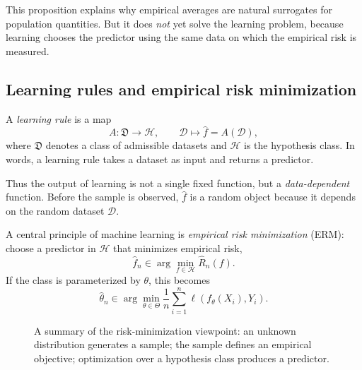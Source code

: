 This proposition explains why empirical averages are natural surrogates for population quantities. But it does \emph{not} yet solve the learning problem, because learning chooses the predictor using the same data on which the empirical risk is measured.

\subsection*{Learning rules and empirical risk minimization}

\begin{definition}
A \emph{learning rule} is a map
\[
A:\mathfrak D \to \mathcal H,
\qquad
\mathcal D \mapsto \hat f=A(\mathcal D),
\]
where $\mathfrak D$ denotes a class of admissible datasets and $\mathcal H$ is the hypothesis class. In words, a learning rule takes a dataset as input and returns a predictor.
\end{definition}

Thus the output of learning is not a single fixed function, but a \emph{data-dependent} function. Before the sample is observed, $\hat f$ is a random object because it depends on the random dataset $\mathcal D$.

A central principle of machine learning is \emph{empirical risk minimization} (ERM): choose a predictor in $\mathcal H$ that minimizes empirical risk,
\[
\hat f_n \in \arg\min_{f\in\mathcal H}\widehat R_n(f).
\]
If the class is parameterized by $\theta$, this becomes
\[
\hat\theta_n \in \arg\min_{\theta\in\Theta}
\frac1n\sum_{i=1}^n \ell(f_\theta(X_i),Y_i).
\]

\begin{figure}[tbp]
\centering
{}
\caption{A summary of the risk-minimization viewpoint: an unknown distribution generates a sample; the sample defines an empirical objective; optimization over a hypothesis class produces a predictor.}
\end{figure}

